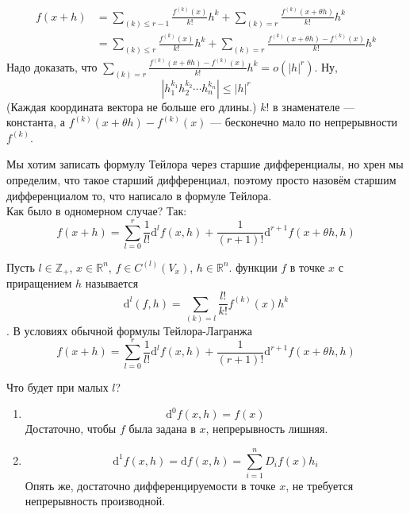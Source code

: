 \documentclass{article}
\begin{document}
\begin{itemize}
\begin{Proof}
\[\begin{split}
                f(x+h)&=\sum\limits_{(k)\leqslant r-1}\frac{f^{(k)}(x)}{k!}h^k+\sum\limits_{(k)=r}\frac{f^{(k)}(x+\theta h)}{k!}h^k\\
                &=\sum\limits_{(k)\leqslant r}\frac{f^{(k)}(x)}{k!}h^k+\sum\limits_{(k)=r}\frac{f^{(k)}(x+\theta h)-f^{(k)}(x)}{k!}h^k
            \end{split}\]
            Надо доказать, что $\sum\limits_{(k)=r}\frac{f^{(k)}(x+\theta h)-f^{(k)}(x)}{k!}h^k=o(|h|^r)$. Ну,
            $$
            |h_1^{k_1}h_2^{k_2}\cdots h_n^{k_n}|\leqslant|h|^r
            $$
            (Каждая координата вектора не больше его длины.) $k!$ в знаменателе --- константа, а $f^{(k)}(x+\theta h)-f^{(k)}(x)$ --- бесконечно мало по непрерывности $f^{(k)}$.
        \end{Proof}
        \begin{Comment}
            Мы хотим записать формулу Тейлора через старшие дифференциалы, но хрен мы определим, что такое старший дифференциал, поэтому просто назовём старшим дифференциалом то, что написало в формуле Тейлора.\\
            Как было в одномерном случае? Так:
            $$
            f(x+h)=\sum\limits_{l=0}^r\frac1{l!}\mathrm d^lf(x,h)+\frac1{(r+1)!}\mathrm d^{r+1}f(x+\theta h,h)
            $$
        \end{Comment}
        \dfn Пусть $l\in\mathbb Z_+$, $x\in\mathbb R^n$, $f\in C^{(l)}(V_x)$, $h\in\mathbb R^n$.  функции $f$ в точке $x$ с приращением $h$ называется
        $$
        \mathrm d^l(f,h)=\sum\limits_{(k)=l}\frac{l!}{k!}f^{(k)}(x)h^k
        $$
        \thm {}. В условиях обычной формулы Тейлора-Лагранжа
        $$
        f(x+h)=\sum\limits_{l=0}^r\frac1{l!}\mathrm d^lf(x,h)+\frac1{(r+1)!}\mathrm d^{r+1}f(x+\theta h,h)
        $$
        \begin{Comment}
            Что будет при малых $l$?
            \begin{enumerate}
                \addtocounter{enumi}{-1}
                \item
                $$
                \mathrm d^0f(x,h)=f(x)
                $$
                Достаточно, чтобы $f$ была задана в $x$, непрерывность лишняя.
                \item
                $$
                \mathrm d^1f(x,h)=\mathrm df(x,h)=\sum\limits_{i=1}^nD_if(x)h_i
                $$
                Опять же, достаточно дифференцируемости в точке $x$, не требуется непрерывность производной.

\end{enumerate}
\end{Comment}
\end{itemize}
\end{document}
